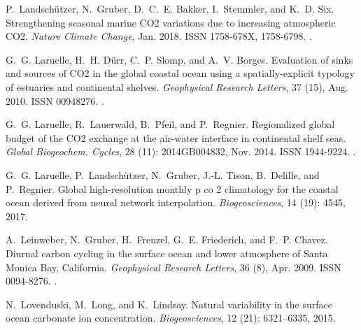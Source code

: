 \documentclass[hvmath, online,bgd]{copernicus_discussions}
\begin{document}
\begin{thebibliography}{84}
	P.~Landsch{\"u}tzer, N.~Gruber, D.~C.~E. Bakker, I.~Stemmler, and K.~D. Six.
	\newblock Strengthening seasonal marine {CO}2 variations due to increasing
	atmospheric {CO}2.
	\newblock \emph{Nature Climate Change}, Jan. 2018.
	\newblock ISSN 1758-678X, 1758-6798.
	\newblock {}.
	
	G.~G. Laruelle, H.~H. D{\"u}rr, C.~P. Slomp, and A.~V. Borges.
	\newblock Evaluation of sinks and sources of {CO}2 in the global coastal ocean
	using a spatially-explicit typology of estuaries and continental shelves.
	\newblock \emph{Geophysical Research Letters}, 37 (15), Aug. 2010.
	\newblock ISSN 00948276.
	\newblock {}.
	
	G.~G. Laruelle, R.~Lauerwald, B.~Pfeil, and P.~Regnier.
	\newblock Regionalized global budget of the {CO}2 exchange at the air-water
	interface in continental shelf seas.
	\newblock \emph{Global Biogeochem. Cycles}, 28 (11):
	2014GB004832, Nov. 2014.
	\newblock ISSN 1944-9224.
	\newblock {}.
	
	G.~G. Laruelle, P.~Landsch{\"u}tzer, N.~Gruber, J.-L. Tison, B.~Delille, and
	P.~Regnier.
	\newblock Global high-resolution monthly p co 2 climatology for the coastal
	ocean derived from neural network interpolation.
	\newblock \emph{Biogeosciences}, 14 (19): 4545, 2017.
	
	A.~Leinweber, N.~Gruber, H.~Frenzel, G.~E. Friederich, and F.~P. Chavez.
	\newblock Diurnal carbon cycling in the surface ocean and lower atmosphere of
	{Santa} {Monica} {Bay}, {California}.
	\newblock \emph{Geophysical Research Letters}, 36 (8), Apr. 2009.
	\newblock ISSN 0094-8276.
	\newblock {}.
	
	N.~Lovenduski, M.~Long, and K.~Lindsay.
	\newblock Natural variability in the surface ocean carbonate ion concentration.
	\newblock \emph{Biogeosciences}, 12 (21): 6321--6335, 2015.
	

\end{thebibliography}
\end{document}
